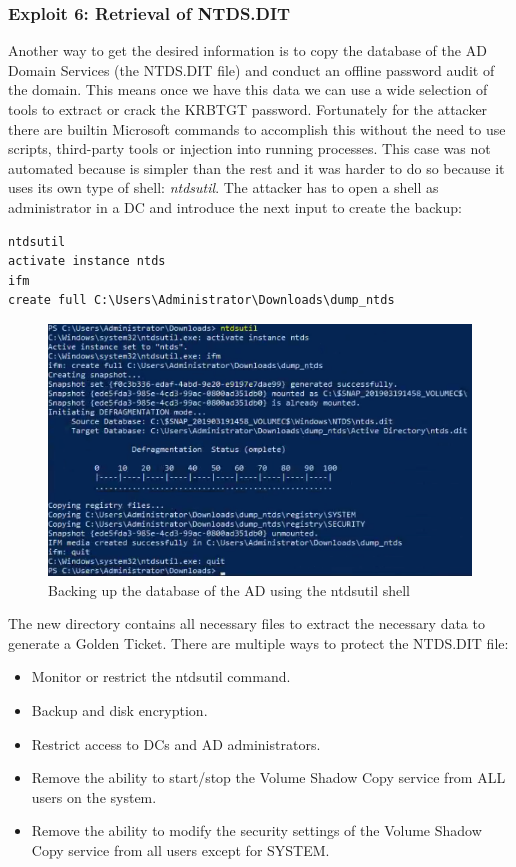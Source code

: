 \subsubsection{Exploit 6: Retrieval of NTDS.DIT}
Another way to get the desired information is to copy the database of the AD Domain Services (the NTDS.DIT file) and conduct an offline password audit of the domain. This means once we have this data we can use a wide selection of tools to extract or crack the KRBTGT password.
Fortunately for the attacker there are builtin Microsoft commands to accomplish this without the need to use scripts, third-party tools or injection into running processes\cite{dump_ways}\cite{ntdsdit_tools}\cite{ntdsutil_cyberis}\cite{extracting_ntds}\cite{ntds_powershell}.
\linej
\linej
This case was not automated because is simpler than the rest and it was harder to do so because it uses its own type of shell: \textit{ntdsutil}.
The attacker has to open a shell as administrator in a DC and introduce the next input to create the backup:
\begin{lstlisting}[style=PS,frame=none]
ntdsutil
activate instance ntds
ifm
create full C:\Users\Administrator\Downloads\dump_ntds
\end{lstlisting}
\begin{figure}[H]
	\centering
	\includegraphics[width=\textwidth]{figuras/ntdsutil.png}
	\caption{Backing up the database of the AD using the ntdsutil shell}
\end{figure}
The new directory contains all necessary files to extract the necessary data to generate a Golden Ticket.
\linej
\linej
There are multiple ways to protect the NTDS.DIT file\cite{protect_NTDS}\cite{hood}:
\begin{itemize}
	\item Monitor or restrict the ntdsutil command.
	\item Backup and disk encryption.
	\item Restrict access to DCs and AD administrators.
	\item Remove the ability to start/stop the Volume Shadow Copy service from ALL users on the system.
	\item Remove the ability to modify the security settings of the Volume Shadow Copy service from all users except for SYSTEM.
\end{itemize}
